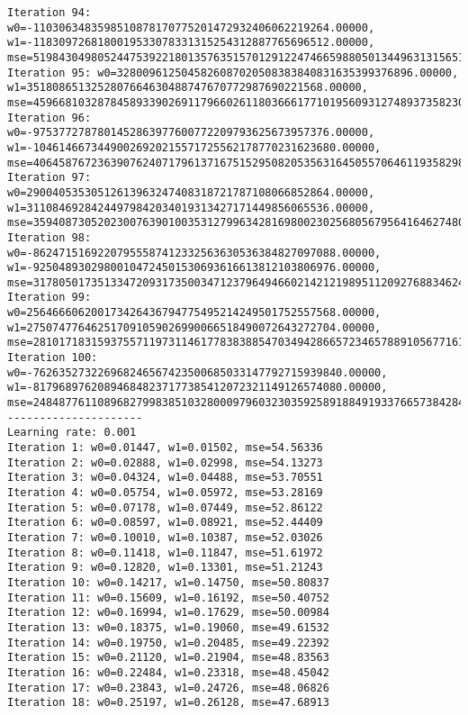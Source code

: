 \documentclass[11pt]{article}
\begin{document}
\begin{Verbatim}[commandchars=\\\{\}]
Iteration 94: w0=-1103063483598510878170775201472932406062219264.00000, w1=-1183097268180019533078331315254312887765696512.00000, mse=5198430498052447539221801357635157012912247466598805013449631315651389393941683404151980032.00000
Iteration 95: w0=3280096125045826087020508383840831635399376896.00000, w1=3518086513252807664630488747670772987690221568.00000, mse=45966810328784589339026911796602611803666177101956093127489373582305028142955470413197475840.00000
Iteration 96: w0=-9753772787801452863977600772209793625673957376.00000, w1=-10461466734490026920215571725562178770231623680.00000, mse=406458767236390762407179613716751529508205356316450557064611935829813463947660987619155640320.00000
Iteration 97: w0=29004053530512613963247408318721787108066852864.00000, w1=31108469284244979842034019313427171449856065536.00000, mse=3594087305202300763901003531279963428169800230256805679564164627480215162348447341707148656640.00000
Iteration 98: w0=-86247151692207955587412332563630536384827097088.00000, w1=-92504893029800104724501530693616613812103806976.00000, mse=31780501735133472093173500347123796494660214212198951120927688346242647052865432552506348535808.00000
Iteration 99: w0=256466606200173426436794775495214249501752557568.00000, w1=275074776462517091059026990066518490072643272704.00000, mse=281017183159375571197311461778383885470349428665723465788910567716191712425222793954238465572864.00000
Iteration 100: w0=-762635273226968246567423500685033147792715939840.00000, w1=-817968976208946848237177385412072321149126574080.00000, mse=2484877611089682799838510328000979603230359258918849193376657384284373755208576534866792783282176.00000
---------------------
Learning rate: 0.001
Iteration 1: w0=0.01447, w1=0.01502, mse=54.56336
Iteration 2: w0=0.02888, w1=0.02998, mse=54.13273
Iteration 3: w0=0.04324, w1=0.04488, mse=53.70551
Iteration 4: w0=0.05754, w1=0.05972, mse=53.28169
Iteration 5: w0=0.07178, w1=0.07449, mse=52.86122
Iteration 6: w0=0.08597, w1=0.08921, mse=52.44409
Iteration 7: w0=0.10010, w1=0.10387, mse=52.03026
Iteration 8: w0=0.11418, w1=0.11847, mse=51.61972
Iteration 9: w0=0.12820, w1=0.13301, mse=51.21243
Iteration 10: w0=0.14217, w1=0.14750, mse=50.80837
Iteration 11: w0=0.15609, w1=0.16192, mse=50.40752
Iteration 12: w0=0.16994, w1=0.17629, mse=50.00984
Iteration 13: w0=0.18375, w1=0.19060, mse=49.61532
Iteration 14: w0=0.19750, w1=0.20485, mse=49.22392
Iteration 15: w0=0.21120, w1=0.21904, mse=48.83563
Iteration 16: w0=0.22484, w1=0.23318, mse=48.45042
Iteration 17: w0=0.23843, w1=0.24726, mse=48.06826
Iteration 18: w0=0.25197, w1=0.26128, mse=47.68913

\end{Verbatim}
\end{document}
